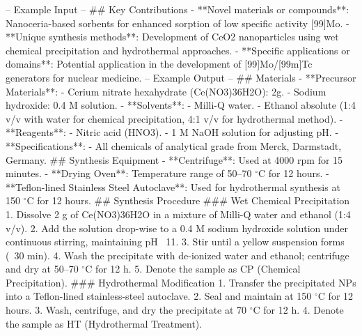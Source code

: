 -- Example Input --
## Key Contributions
- **Novel materials or compounds**: Nanoceria-based sorbents for enhanced sorption of low specific activity [99]Mo.
- **Unique synthesis methods**: Development of CeO2 nanoparticles using wet chemical precipitation and hydrothermal approaches.
- **Specific applications or domains**: Potential application in the development of [99]Mo/[99m]Tc generators for nuclear medicine. 
-- Example Output --
## Materials
- **Precursor Materials**:
  - Cerium nitrate hexahydrate (Ce(NO3)3\cdot6H2O): 2g.
  - Sodium hydroxide: 0.4 M solution.
- **Solvents**:
  - Milli-Q water.
  - Ethanol absolute (1:4 v/v with water for chemical precipitation, 4:1 v/v for hydrothermal method).
- **Reagents**:
  - Nitric acid (HNO3).
  - 1 M NaOH solution for adjusting pH.
- **Specifications**:
  - All chemicals of analytical grade from Merck, Darmstadt, Germany.
## Synthesis Equipment
- **Centrifuge**: Used at 4000 rpm for 15 minutes.
- **Drying Oven**: Temperature range of 50–70 $^{\circ}$C for 12 hours.
- **Teflon-lined Stainless Steel Autoclave**: Used for hydrothermal synthesis at 150 $^{\circ}$C for 12 hours.
## Synthesis Procedure
### Wet Chemical Precipitation
1. Dissolve 2 g of Ce(NO3)3\cdot6H2O in a mixture of Milli-Q water and ethanol (1:4 v/v).
2. Add the solution drop-wise to a 0.4 M sodium hydroxide solution under continuous stirring, maintaining pH ~11.
3. Stir until a yellow suspension forms (~30 min). 
4. Wash the precipitate with de-ionized water and ethanol; centrifuge and dry at 50–70 $^{\circ}$C for 12 h. 
5. Denote the sample as CP (Chemical Precipitation).
### Hydrothermal Modification
1. Transfer the precipitated NPs into a Teflon-lined stainless-steel autoclave.
2. Seal and maintain at 150 $^{\circ}$C for 12 hours.
3. Wash, centrifuge, and dry the precipitate at 70 $^{\circ}$C for 12 h.
4. Denote the sample as HT (Hydrothermal Treatment).